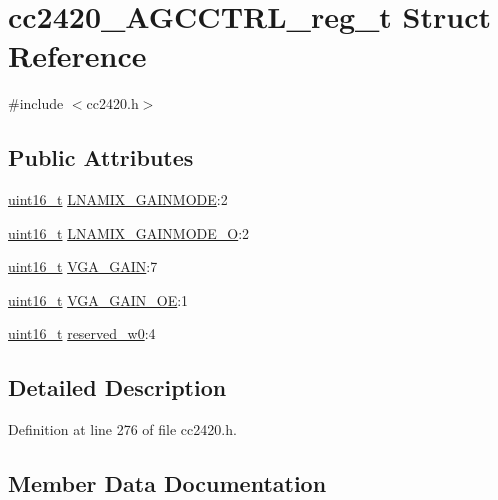 \hypertarget{structcc2420___a_g_c_c_t_r_l__reg__t}{}\section{cc2420\+\_\+\+A\+G\+C\+C\+T\+R\+L\+\_\+reg\+\_\+t Struct Reference}
\label{structcc2420___a_g_c_c_t_r_l__reg__t}


{\ttfamily \#include $<$cc2420.\+h$>$}

\subsection*{Public Attributes}
\begin{DoxyCompactItemize}
\item 
\hyperlink{_p_e___types_8h_a1f1825b69244eb3ad2c7165ddc99c956}{uint16\+\_\+t} \hyperlink{structcc2420___a_g_c_c_t_r_l__reg__t_a1478d5b1efcbc6ffc9af5822f767c5e2}{L\+N\+A\+M\+I\+X\+\_\+\+G\+A\+I\+N\+M\+O\+DE}\+:2
\item 
\hyperlink{_p_e___types_8h_a1f1825b69244eb3ad2c7165ddc99c956}{uint16\+\_\+t} \hyperlink{structcc2420___a_g_c_c_t_r_l__reg__t_a6956a8cd27aa2c8a90707c071391a3ff}{L\+N\+A\+M\+I\+X\+\_\+\+G\+A\+I\+N\+M\+O\+D\+E\+\_\+O}\+:2
\item 
\hyperlink{_p_e___types_8h_a1f1825b69244eb3ad2c7165ddc99c956}{uint16\+\_\+t} \hyperlink{structcc2420___a_g_c_c_t_r_l__reg__t_a26798a7ce696996051d3c04197ccf319}{V\+G\+A\+\_\+\+G\+A\+IN}\+:7
\item 
\hyperlink{_p_e___types_8h_a1f1825b69244eb3ad2c7165ddc99c956}{uint16\+\_\+t} \hyperlink{structcc2420___a_g_c_c_t_r_l__reg__t_a87fa564c144bbcf5602f83734c9ffb81}{V\+G\+A\+\_\+\+G\+A\+I\+N\+\_\+\+OE}\+:1
\item 
\hyperlink{_p_e___types_8h_a1f1825b69244eb3ad2c7165ddc99c956}{uint16\+\_\+t} \hyperlink{structcc2420___a_g_c_c_t_r_l__reg__t_a6e3c5c5fa089d68b0acba0d66407816f}{reserved\+\_\+w0}\+:4
\end{DoxyCompactItemize}


\subsection{Detailed Description}


Definition at line 276 of file cc2420.\+h.



\subsection{Member Data Documentation}
